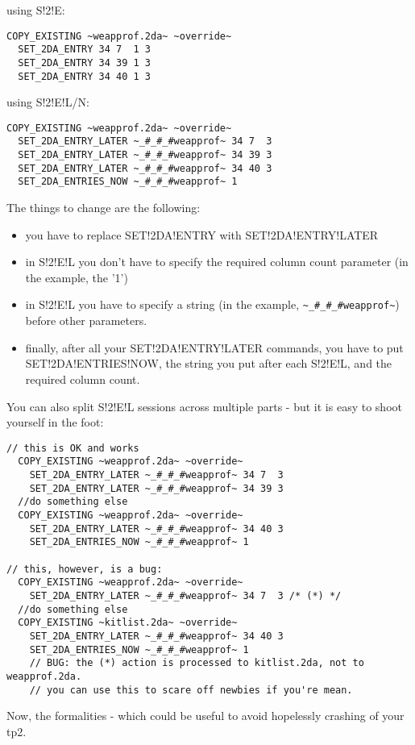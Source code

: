\documentclass{article}
\begin{document}
using S!2!E:
\begin{verbatim}
COPY_EXISTING ~weapprof.2da~ ~override~
  SET_2DA_ENTRY 34 7  1 3
  SET_2DA_ENTRY 34 39 1 3
  SET_2DA_ENTRY 34 40 1 3
\end{verbatim}

using S!2!E!L/N:
\begin{verbatim}
COPY_EXISTING ~weapprof.2da~ ~override~
  SET_2DA_ENTRY_LATER ~_#_#_#weapprof~ 34 7  3
  SET_2DA_ENTRY_LATER ~_#_#_#weapprof~ 34 39 3
  SET_2DA_ENTRY_LATER ~_#_#_#weapprof~ 34 40 3
  SET_2DA_ENTRIES_NOW ~_#_#_#weapprof~ 1
\end{verbatim}

The things to change are the following:
\begin{itemize}
\item you have to replace SET!2DA!ENTRY with SET!2DA!ENTRY!LATER
\item in S!2!E!L you don't have to specify the required column count parameter
(in the example, the '1')
\item in S!2!E!L you have to specify a string (in the example,
\verb+~_#_#_#weapprof~+) before other parameters.
\item finally, after all your SET!2DA!ENTRY!LATER commands, you have to put
SET!2DA!ENTRIES!NOW, the string you put after each S!2!E!L, and the required
column count.
\end{itemize}

You can also split S!2!E!L sessions across multiple parts - but it is easy to shoot
yourself in the foot:
\begin{verbatim}
// this is OK and works
  COPY_EXISTING ~weapprof.2da~ ~override~
    SET_2DA_ENTRY_LATER ~_#_#_#weapprof~ 34 7  3
    SET_2DA_ENTRY_LATER ~_#_#_#weapprof~ 34 39 3
  //do something else
  COPY_EXISTING ~weapprof.2da~ ~override~
    SET_2DA_ENTRY_LATER ~_#_#_#weapprof~ 34 40 3
    SET_2DA_ENTRIES_NOW ~_#_#_#weapprof~ 1

// this, however, is a bug:
  COPY_EXISTING ~weapprof.2da~ ~override~
    SET_2DA_ENTRY_LATER ~_#_#_#weapprof~ 34 7  3 /* (*) */
  //do something else
  COPY_EXISTING ~kitlist.2da~ ~override~
    SET_2DA_ENTRY_LATER ~_#_#_#weapprof~ 34 40 3
    SET_2DA_ENTRIES_NOW ~_#_#_#weapprof~ 1
    // BUG: the (*) action is processed to kitlist.2da, not to weapprof.2da.
    // you can use this to scare off newbies if you're mean.
\end{verbatim}

Now, the formalities - which could be useful to avoid hopelessly crashing of your tp2.
\end{document}
